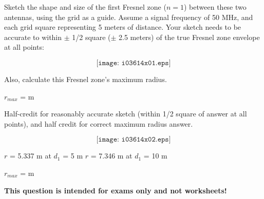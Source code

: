 

Sketch the shape and size of the first Fresnel zone ($n=1$) between these two antennas, using the grid as a guide.  Assume a signal frequency of 50 MHz, and each grid square representing 5 meters of distance.  Your sketch needs to be accurate to within $\pm$ 1/2 square ($\pm$ 2.5 meters) of the true Fresnel zone envelope at all points:

$$\texttt{[image: i03614x01.eps]}$$

Also, calculate this Fresnel zone's maximum radius.

\vskip 10pt

$r_{max}$ = \underbar{\hskip 50pt} m







Half-credit for reasonably accurate sketch (within 1/2 square of answer at all points), and half credit for correct maximum radius answer.

$$\texttt{[image: i03614x02.eps]}$$

$r$ = 5.337 m at $d_1$ = 5 m \hskip 30pt $r$ = 7.346 m at $d_1$ = 10 m

\vskip 10pt

$r_{max}$ =  m







{\bf This question is intended for exams only and not worksheets!}



